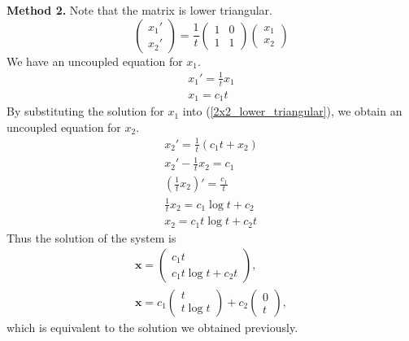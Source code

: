 {\begin{Solution}
\begin{enumerate}
    \textbf{Method 2.}
    Note that the matrix is lower triangular.  
    \begin{equation}
      \label{2x2_lower_triangular}
      \begin{pmatrix} x_1' \\ x_2' \end{pmatrix} = \frac{1}{t} 
      \begin{pmatrix} 1 & 0 \\ 1 & 1 \end{pmatrix}
      \begin{pmatrix} x_1 \\ x_2 \end{pmatrix} 
    \end{equation}
    We have an uncoupled equation for $x_1$.
    \begin{gather*}
      x_1' = \frac{1}{t} x_1 \\
      x_1 = c_1 t
    \end{gather*}
    By substituting the solution for $x_1$ into (\ref{2x2_lower_triangular}), 
    we obtain an uncoupled equation for $x_2$.
    \begin{gather*}
      x_2' = \frac{1}{t} \left( c_1 t + x_2 \right) \\
      x_2' - \frac{1}{t} x_2 = c_1 \\
      \left( \frac{1}{t} x_2 \right)' = \frac{c_1}{t} \\
      \frac{1}{t} x_2 = c_1 \log t + c_2 \\
      x_2 = c_1 t \log t + c_2 t
    \end{gather*}
    Thus the solution of the system is
    \begin{gather*}
      \mathbf{x} = \begin{pmatrix} c_1 t \\ c_1 t \log t + c_2 t \end{pmatrix}, \\
      \boxed{
        \mathbf{x} = c_1 \begin{pmatrix} t \\ t \log t \end{pmatrix}
        + c_2 \begin{pmatrix} 0 \\ t \end{pmatrix},
        }
    \end{gather*}
    which is equivalent to the solution we obtained previously.
  \end{enumerate}
\end{Solution}









}



\raggedbottom








